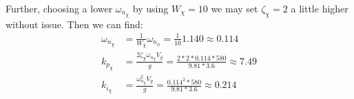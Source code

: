Further, choosing a lower $\omega_{n_\chi}$ by using $W_\chi = 10$ we may set $\zeta_\chi = 2$ a little higher without issue. Then we can find:
\begin{align*}
    \omega_{n_\chi} &= \frac{1}{W_\chi} \omega_{n_\phi} 
    = \frac{1}{10} 1.140 \approx 0.114 \\
    k_{p_\chi} &= \frac{2 \zeta_\chi \omega_{n_\chi} V_g}{g} 
    = \frac{2 * 2 * 0.114 * 580}{9.81 * 3.6} 
    \approx 7.49 \\
    k_{i_\chi} &= \frac{\omega_{n_\chi}^2 V_g}{g}
    = \frac{0.114^2 * 580}{9.81 * 3.6} 
    \approx 0.214
\end{align*}

